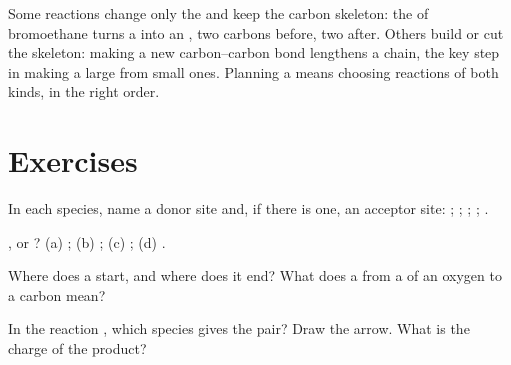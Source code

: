 \begin{remark}\label{rem:g12:curly-arrows:skeleton}
Some reactions change only the  and keep the carbon
skeleton: the  of bromoethane turns a  into an
, two carbons before, two after. Others build or cut the
skeleton: making a new carbon--carbon bond lengthens a chain, the key
step in making a large  from small ones. Planning a 
means choosing reactions of both kinds, in the right order.
\end{remark}

\section{Exercises}

\begin{exercise}[$\star$]\label{exo:g12:curly-arrows:1}
In each species, name a donor site and, if there is one, an acceptor
site: ; ; ; ; .
\end{exercise}

\begin{exercise}[$\star$]\label{exo:g12:curly-arrows:2}
,  or ?
(a) ;
(b) ;
(c) ;
(d) .
\end{exercise}

\begin{exercise}[$\star$]\label{exo:g12:curly-arrows:3}
Where does a  start, and where does it end? What does a  from a  of an oxygen  to a carbon  mean?
\end{exercise}

\begin{exercise}[$\star$]\label{exo:g12:curly-arrows:4}
In the reaction , which species gives the pair?
Draw the arrow. What is the charge of the product?
\end{exercise}

